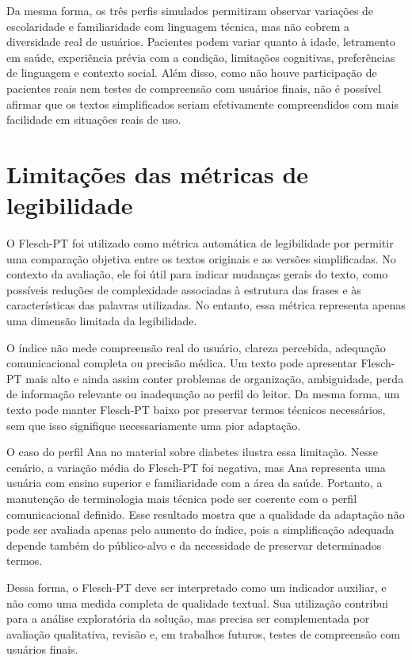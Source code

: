 Da mesma forma, os três perfis simulados permitiram observar variações de escolaridade e familiaridade com linguagem técnica, mas não cobrem a diversidade real de usuários. Pacientes podem variar quanto à idade, letramento em saúde, experiência prévia com a condição, limitações cognitivas, preferências de linguagem e contexto social. Além disso, como não houve participação de pacientes reais nem testes de compreensão com usuários finais, não é possível afirmar que os textos simplificados seriam efetivamente compreendidos com mais facilidade em situações reais de uso.

\section{Limitações das métricas de legibilidade}
\label{sec:limitacoes-metricas-legibilidade}

O Flesch-PT foi utilizado como métrica automática de legibilidade por permitir uma comparação objetiva entre os textos originais e as versões simplificadas. No contexto da avaliação, ele foi útil para indicar mudanças gerais do texto, como possíveis reduções de complexidade associadas à estrutura das frases e às características das palavras utilizadas. No entanto, essa métrica representa apenas uma dimensão limitada da legibilidade.

O índice não mede compreensão real do usuário, clareza percebida, adequação comunicacional completa ou precisão médica. Um texto pode apresentar Flesch-PT mais alto e ainda assim conter problemas de organização, ambiguidade, perda de informação relevante ou inadequação ao perfil do leitor. Da mesma forma, um texto pode manter Flesch-PT baixo por preservar termos técnicos necessários, sem que isso signifique necessariamente uma pior adaptação.

O caso do perfil Ana no material sobre diabetes ilustra essa limitação. Nesse cenário, a variação média do Flesch-PT foi negativa, mas Ana representa uma usuária com ensino superior e familiaridade com a área da saúde. Portanto, a manutenção de terminologia mais técnica pode ser coerente com o perfil comunicacional definido. Esse resultado mostra que a qualidade da adaptação não pode ser avaliada apenas pelo aumento do índice, pois a simplificação adequada depende também do público-alvo e da necessidade de preservar determinados termos.

Dessa forma, o Flesch-PT deve ser interpretado como um indicador auxiliar, e não como uma medida completa de qualidade textual. Sua utilização contribui para a análise exploratória da solução, mas precisa ser complementada por avaliação qualitativa, revisão e, em trabalhos futuros, testes de compreensão com usuários finais.

